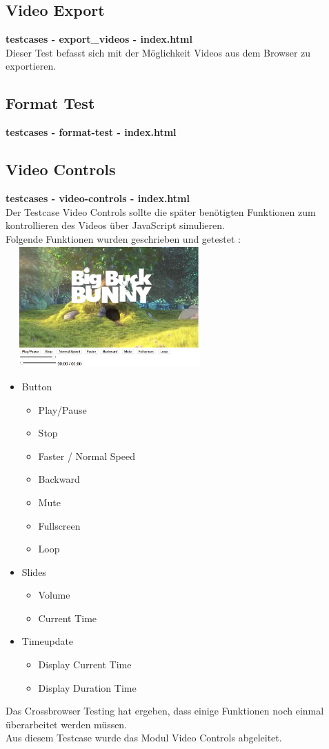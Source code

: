 \documentclass[a4paper,10pt]{scrartcl}
\begin{document}
\subsection{Video Export}
\textbf{testcases - export\_videos - index.html} \\
Dieser Test befasst sich mit der Möglichkeit Videos aus dem Browser zu exportieren. 
\subsection{Format Test}
\textbf{testcases - format-test - index.html} \\
\newpage
\subsection{Video Controls}
\textbf{testcases - video-controls - index.html} \\
Der Testcase Video Controls sollte die später benötigten Funktionen zum kontrollieren des Videos über JavaScript simulieren.\\ Folgende Funktionen wurden geschrieben und getestet : \\
\includegraphics[height=176px, width=300px]{images/videocontrols.png}\\
\begin{itemize}
	\item Button
	\begin{itemize}
		\item Play/Pause
		\item Stop
		\item Faster / Normal Speed
		\item Backward
		\item Mute
		\item Fullscreen
		\item Loop
	\end{itemize}
	\item Slides
	\begin{itemize}
		\item Volume
		\item Current Time
	\end{itemize}
	\item Timeupdate
	\begin{itemize}
		\item Display Current Time
		\item Display Duration Time
	\end{itemize}
\end{itemize}
Das Crossbrowser Testing hat ergeben, dass einige Funktionen noch einmal überarbeitet werden müssen.\\
Aus diesem Testcase wurde das Modul Video Controls abgeleitet. 
\newpage
\end{document}
